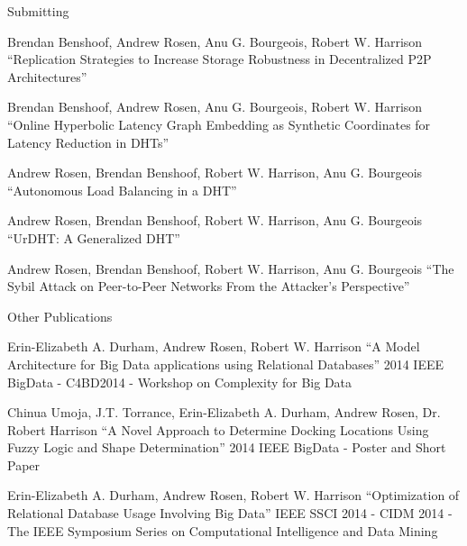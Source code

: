 \documentclass[11pt]{beamer}
\begin{document}
\begin{frame}{Submitting}
	\begin{itemize}\footnotesize{
		\item Brendan Benshoof, Andrew Rosen, Anu G. Bourgeois, Robert W. Harrison ``Replication Strategies to Increase Storage Robustness in Decentralized P2P Architectures''
		\item Brendan Benshoof, Andrew Rosen, Anu G. Bourgeois, Robert W. Harrison ``Online Hyperbolic Latency Graph Embedding as Synthetic Coordinates for Latency Reduction in DHTs''
		\item Andrew Rosen, Brendan Benshoof, Robert W. Harrison, Anu G. Bourgeois ``Autonomous Load Balancing in a DHT''
		\item Andrew Rosen, Brendan Benshoof, Robert W. Harrison, Anu G. Bourgeois ``UrDHT: A Generalized DHT''
		\item Andrew Rosen, Brendan Benshoof, Robert W. Harrison, Anu G. Bourgeois ``The Sybil Attack on Peer-to-Peer Networks From the Attacker's Perspective''}
	\end{itemize}
\end{frame}

\begin{frame}{Other Publications}

	\begin{itemize}
		\footnotesize{
		\item  Erin-Elizabeth A. Durham, Andrew Rosen, Robert W. Harrison
		``A Model Architecture for Big Data applications using Relational Databases''
		2014 IEEE BigData - C4BD2014 - Workshop on Complexity for Big Data  
		\item Chinua Umoja, J.T. Torrance, Erin-Elizabeth A. Durham, Andrew Rosen, Dr. Robert Harrison
		``A Novel Approach to Determine Docking Locations Using Fuzzy Logic and Shape Determination''
		2014 IEEE BigData - Poster and Short Paper 
		\item  Erin-Elizabeth A. Durham, Andrew Rosen, Robert W. Harrison
		``Optimization of Relational Database Usage Involving Big Data'' 
		IEEE SSCI 2014 - CIDM 2014 - The IEEE Symposium Series on Computational Intelligence and Data Mining }
	\end{itemize}
\end{frame}
\end{document}

